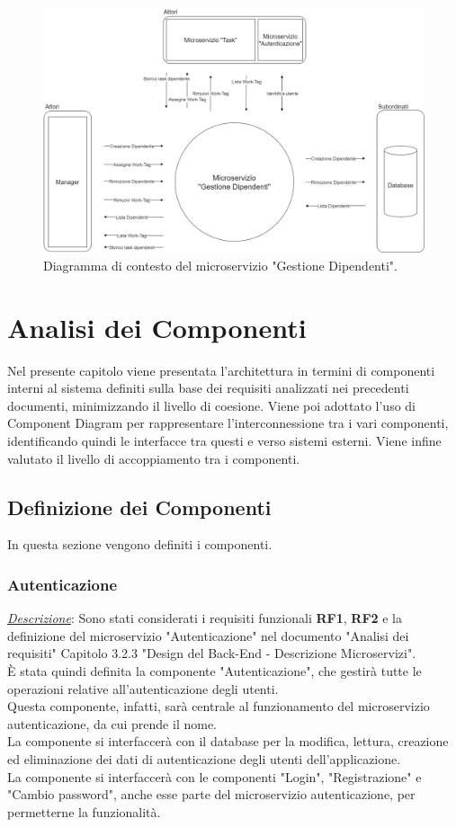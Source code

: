 \documentclass{report}
\begin{document}
\begin{figure}[H]
	\centering\includegraphics[width=1\textwidth]{images/Diagrammi_Contesto/Diagramma_Contesto_Dipendenti.png}
	Diagramma di contesto del microservizio "Gestione Dipendenti".
\end{figure}

\chapter{Analisi dei Componenti}
Nel presente capitolo viene presentata l’architettura in termini di componenti interni al sistema definiti sulla base dei requisiti analizzati nei precedenti documenti, minimizzando il livello di coesione. Viene poi adottato l’uso di Component Diagram per rappresentare l’interconnessione tra i vari componenti, identificando quindi le interfacce tra questi e verso sistemi esterni. Viene infine valutato il livello di accoppiamento tra i componenti.


\section{Definizione dei Componenti}
In questa sezione vengono definiti i componenti.

\subsection*{Autenticazione}
\uline{\textit{Descrizione}}: 
Sono stati considerati i requisiti funzionali \textbf{RF1}, \textbf{RF2} e la definizione del microservizio "Autenticazione" nel documento "Analisi dei requisiti"
Capitolo 3.2.3 "Design del Back-End - Descrizione Microservizi".\\
È stata quindi definita la componente "Autenticazione", che gestirà tutte le operazioni relative all'autenticazione degli utenti.\\
Questa componente, infatti, sarà centrale al funzionamento del microservizio autenticazione, da cui prende il nome.\\
La componente si interfaccerà  con il database per la modifica, lettura, creazione ed eliminazione dei dati di autenticazione degli utenti dell'applicazione.\\
La componente si interfaccerà con le componenti "Login", "Registrazione" e "Cambio password", anche esse parte del microservizio autenticazione, per permetterne la funzionalità.\\
\end{document}
